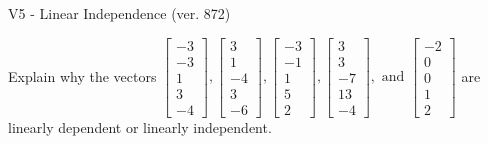 \begin{exercise}
  \begin{exerciseTitle}V5 - Linear Independence (ver. 872)\end{exerciseTitle}
  \begin{exerciseStatement}
    Explain why the vectors \(\left[\begin{array}{r}
-3 \\
-3 \\
1 \\
3 \\
-4
\end{array}\right] , \left[\begin{array}{r}
3 \\
1 \\
-4 \\
3 \\
-6
\end{array}\right] , \left[\begin{array}{r}
-3 \\
-1 \\
1 \\
5 \\
2
\end{array}\right] , \left[\begin{array}{r}
3 \\
3 \\
-7 \\
13 \\
-4
\end{array}\right] , \text{ and } \left[\begin{array}{r}
-2 \\
0 \\
0 \\
1 \\
2
\end{array}\right]\) are linearly dependent or linearly independent.	



\end{exerciseStatement}
\end{exercise}

